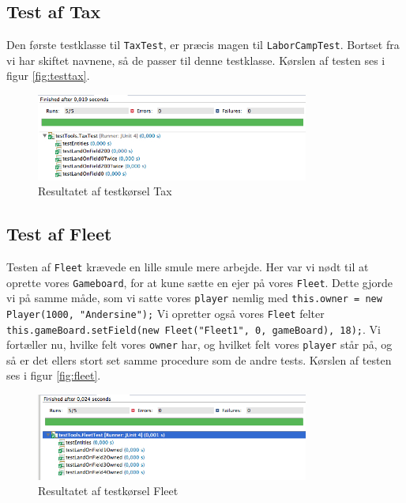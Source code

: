 \subsection{Test af Tax}
Den første testklasse til \texttt{TaxTest}, er præcis magen til \texttt{LaborCampTest}. Bortset fra vi har skiftet navnene, så de passer til denne testklasse.  Kørslen af testen ses i figur \vref{fig:testtax}.
\begin{figure}[!ht]
\centering
\includegraphics[width=0.8\textwidth]{TaxTest.jpg}
\caption[<Text for the list of figures>]{Resultatet af testkørsel Tax}
\label{fig:testtax} 
\end{figure}
\subsection{Test af Fleet}
Testen af \texttt{Fleet} krævede en lille smule mere arbejde. Her var vi nødt til at oprette vores \texttt{Gameboard}, for at kune sætte en ejer på vores \texttt{Fleet}. Dette gjorde vi på samme måde, som vi satte vores \texttt{player} nemlig med \texttt{this.owner = new Player(1000, "Andersine");} Vi opretter også vores \texttt{Fleet} felter \texttt{this.gameBoard.setField(new Fleet("Fleet1", 0, gameBoard), 18);}. Vi fortæller nu, hvilke felt vores \texttt{owner} har, og hvilket felt vores \texttt{player} står på, og så er det ellers stort set samme procedure som de andre tests. Kørslen af testen ses i figur \vref{fig:fleet}.
\begin{figure}[!ht]
\centering
\includegraphics[width=0.8\textwidth]{FleetTest.jpg}
\caption[<Text for the list of figures>]{Resultatet af testkørsel Fleet}
\label{fig:fleet} 
\end{figure}
